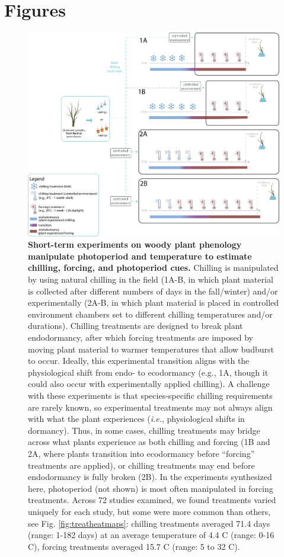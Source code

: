\documentclass{article}
\begin{document}
\clearpage
\section* {Figures}
\begin{figure}[h!]
\centering
\noindent 
\includegraphics[width=1\textwidth]{figures/concept/Fig_bbconcept_dormant_V8.png}

\caption{\textbf{Short-term experiments on woody plant phenology manipulate photoperiod and temperature to estimate chilling, forcing, and photoperiod cues.} Chilling is manipulated by using natural chilling in the field (1A-B, in which plant material is collected after different numbers of days in the fall/winter) and/or experimentally (2A-B, in which plant material is placed in controlled environment chambers set to different chilling temperatures and/or durations). Chilling treatments are designed to break plant endodormancy, after which forcing treatments are imposed by moving plant material to warmer temperatures that allow budburst to occur. Ideally, this experimental transition aligns with the physiological shift from endo- to ecodormancy (e.g., 1A, though it could also occur with experimentally applied chilling). A challenge with these experiments is that species-specific chilling requirements are rarely known, so experimental treatments may not always align with what the plant experiences (\emph{i.e.}, physiological shifts in dormancy). Thus, in some cases, chilling treatments may bridge across what plants experience as both chilling and forcing (1B and 2A, where plants transition into ecodormancy before ``forcing'' treatments are applied), or chilling treatments may end before endodormancy is fully broken (2B). In the experiments synthesized here, photoperiod (not shown) is most often manipulated in forcing treatments. Across 72 studies examined, we found treatments varied uniquely for each study, but some were more common than others, see Fig. \ref{fig:treatheatmaps}: chilling treatments averaged 71.4 days (range: 1-182 days) at an average temperature of 4.4 \degree C (range: 0-16 \degree C), forcing treatments averaged 15.7 \degree C (range: 5 to 32 \degree C).}
\label{fig:concept} 
\end{figure}
\end{document}
